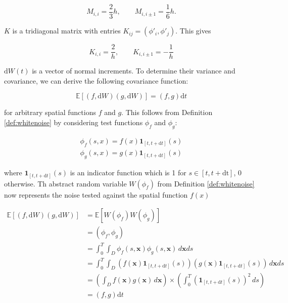 \begin{equation*}
    M_{i,i} = \frac{2}{3}h, \qquad M_{i, i\pm 1} = \frac{1}{6}h.
\end{equation*}

$K$ is a tridiagonal matrix with entries $K_{ij} =(\phi'_i, \phi'_j)$. This gives

\begin{equation*}
    K_{i,i} = \frac{2}{h}, \qquad K_{i, i\pm 1} = - \frac{1}{h}
\end{equation*}

$\mathrm{d}W(t)$ is a vector of normal increments. To determine their variance and covariance, 
we can derive the following covariance function:

\begin{equation*}
    \mathbb{E}[(f, \mathrm{d}W)(g, \mathrm{d}W)] = (f,g) \mathrm{d}t
\end{equation*}

for arbitrary spatial functions $f$ and $g$. This follows from Definition \ref{def:whitenoise}
by considering test functions $\phi_f$ and $\phi_g$:

\begin{align*}
    \phi_f(s,x) = f(x)\mathbf{1}_{[t, t+\mathrm{d}t]}(s)\\
    \phi_g(s,x) = g(x)\mathbf{1}_{[t, t+\mathrm{d}t]}(s)
\end{align*}

where $\mathbf{1}_{[t, t+\mathrm{d}t]}(s)$ is an indicator function which is 1 for
$s \in [t, t + \mathrm{dt}]$, $0$ otherwise. Th abstract random variable 
$W(\phi_f)$ from Definition \ref{def:whitenoise} now represents the noise tested 
against the spatial function $f(x)$


\begin{align*} 
    \mathbb{E}[(f, \mathrm{d}W)(g, \mathrm{d}W)] &= \mathbb{E}[W(\phi_f)W(\phi_g)] \\ 
    &= (\phi_f, \phi_g) \\ &= \int_0^T \int_D \phi_f(s, \mathbf{x}) \phi_g(s, \mathbf{x})
     \,d\mathbf{x}ds \\ &= \int_0^T \int_D \left( f(\mathbf{x}) \mathbf{1}_{[t, t+\mathrm{d}t]}(s) \right) 
     \left( g(\mathbf{x}) \mathbf{1}_{[t, t+\mathrm{d}t]}(s) \right) \,d\mathbf{x}ds \\
    &= \left( \int_D f(\mathbf{x})g(\mathbf{x})\,d\mathbf{x} \right)
     \times \left( \int_0^T (\mathbf{1}_{[t, t+\mathrm{d}t]}(s))^2 \,ds \right)  \\
    &= \left(f,g\right) \mathrm{d}t
\end{align*} 

